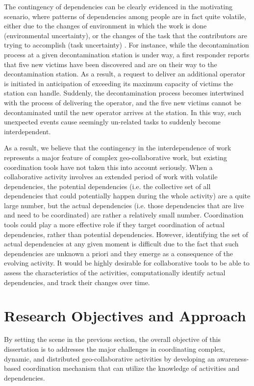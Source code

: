 The contingency of dependencies can be clearly evidenced in the motivating scenario, where patterns of dependencies among people are in fact quite volatile, either due to the changes of environment in which the work is done (environmental uncertainty), or the changes of the task that the contributors are trying to accomplish (task uncertainty) \cite{kittur2009coordination}. For instance, while the decontamination process at a given decontamination station is under way, a first responder reports that five new victims have been discovered and are on their way to the decontamination station. As a result, a request to deliver an additional operator is initiated in anticipation of exceeding its maximum capacity of victims the station can handle. Suddenly, the decontamination process becomes intertwined with the process of delivering the operator, and the five new victims cannot be decontaminated until the new operator arrives at the station. In this way, such unexpected events cause seemingly un-related tasks to suddenly become interdependent.

As a result, we believe that the contingency in the interdependence of work represents a major feature of complex geo-collaborative work, but existing coordination tools have not taken this into account seriously. When a collaborative activity involves an extended period of work with volatile dependencies, the potential dependencies (i.e. the collective set of all dependencies that could potentially happen during the whole activity) are a quite large number, but the actual dependencies (i.e. those dependencies that are live and need to be coordinated) are rather a relatively small number. Coordination tools could play a more effective role if they target coordination of actual dependencies, rather than potential dependencies. However, identifying the set of actual dependencies at any given moment is difficult due to the fact that such dependencies are unknown a priori and they emerge as a consequence of the evolving activity. It would be highly desirable for collaborative tools to be able to assess the characteristics of the activities, computationally identify actual dependencies, and track their changes over time. 


\section{Research Objectives and Approach} %
\label{sec:research_objectives}
By setting the scene in the previous section, the overall objective of this dissertation is to addresses the major challenges in coordinating complex, dynamic, and distributed geo-collaborative activities by developing an awareness-based coordination mechanism that can utilize the knowledge of activities and dependencies.

